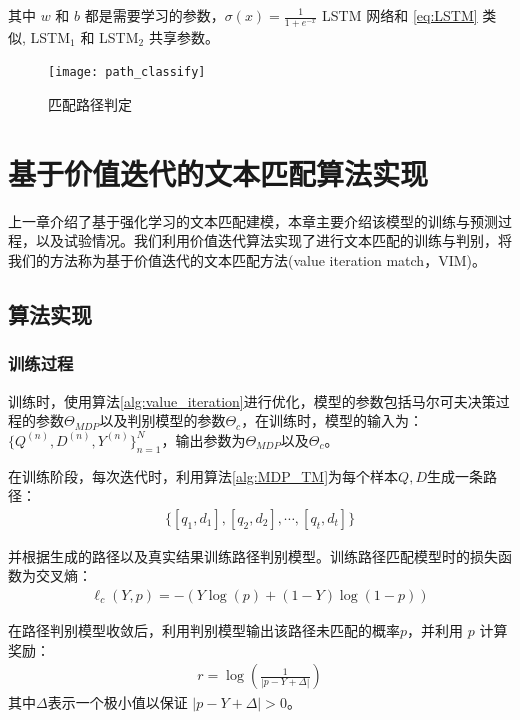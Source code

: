 其中 $w$ 和 $b$ 都是需要学习的参数，$\sigma(x) = \frac{1}{1+e^{-x}}$
LSTM 网络和 \ref{eq:LSTM} 类似, LSTM$_1$  和 LSTM$_2$ 共享参数。
\begin{figure}[!htbp]
    \centering
    \vspace{1em}
    \texttt{[image: path\_classify]}
    \caption{匹配路径判定}
    \label{fig:path_classify}
    \vspace{1em}
\end{figure}


\chapter{基于价值迭代的文本匹配算法实现}
上一章介绍了基于强化学习的文本匹配建模，本章主要介绍该模型的训练与预测过程，以及试验情况。我们利用价值迭代算法实现了进行文本匹配的训练与判别，将我们的方法称为基于价值迭代的文本匹配方法(value iteration match，VIM)。
\section{算法实现}

\subsection{训练过程}

训练时，使用算法\ref{alg:value_iteration}进行优化，模型的参数包括马尔可夫决策过程的参数$\Theta_{MDP}$以及判别模型的参数$\Theta_c$，在训练时，模型的输入为：$\{Q^{(n)}, D^{(n)}, Y^{(n)}\}_{n=1}^N$，输出参数为$\Theta_{MDP}$以及$\Theta_c$。

在训练阶段，每次迭代时，利用算法\ref{alg:MDP_TM}为每个样本$Q, D$生成一条路径：
\begin{equation}\label{eq:mdp_path}
	\begin{aligned}
		\{[q_1, d_1], [q_2, d_2], \cdots, [q_t, d_t]\}
	\end{aligned}
\end{equation}

并根据生成的路径以及真实结果训练路径判别模型。训练路径匹配模型时的损失函数为交叉熵：
\begin{equation}\label{eq:classify_model}
	\begin{aligned}
		\ell_c(Y, p) = -(Y\log(p) + (1-Y)\log(1-p))
	\end{aligned}
\end{equation}

在路径判别模型收敛后，利用判别模型输出该路径未匹配的概率$p$，并利用 $p$ 计算奖励：
\begin{equation}\label{eq:reward}
	\begin{aligned}
		r = \log(\frac{1}{|p-Y+\Delta|})
	\end{aligned}
\end{equation}
其中$\Delta$表示一个极小值以保证 $|p-Y+\Delta| > 0$。

